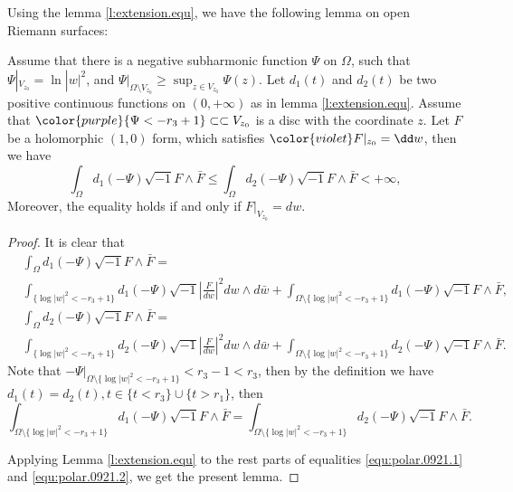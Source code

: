 Using the lemma \ref{l:extension.equ}, we have the following lemma on open Riemann
surfaces:

\begin{lemma}
  Assume that there is a negative
subharmonic function $\Psi$ on $\Omega$, such that
$\Psi|_{V_{z_0}}=\ln|w|^{2}$, and $\Psi|_{\Omega\setminus
V_{z_0}}\geq\sup_{z\in V_{z_0}}\Psi(z)$. Let $d_{1}(t)$ and
$d_{2}(t)$ be two positive continuous functions on $(0,+\infty)$ as
in lemma \ref{l:extension.equ}. Assume that
${\color{purple}\{\Psi<-r_{3}+1\}\subset\subset V_{z_0}}$ is a disc with the
coordinate $z$. Let $F$ be a holomorphic $(1,0)$ form, which
satisfies ${\color{violet} F|_{z_{0}}=\dd w}$, then we have
$$\int_{\Omega}d_{1}(-\Psi)\sqrt{-1}F\wedge\bar{F}\leq\int_{\Omega}d_{2}(-\Psi)\sqrt{-1}F\wedge\bar{F}<+\infty,$$
Moreover, the equality holds if and only if $F|_{V_{z_0}}=dw$.
\end{lemma}

\begin{proof}
  It is clear that
  \begin{equation}
  \label{equ:polar.0921.1}
  \begin{split}
  &\int_{\Omega}d_{1}(-\Psi)\sqrt{-1}F\wedge\bar{F}
  =
  \\&\int_{\{\log|w|^{2}<-r_{3}+1\}}d_{1}(-\Psi)\sqrt{-1}|\frac{F}{dw}|^{2}dw\wedge d\bar{w}+
  \int_{\Omega\setminus\{\log|w|^{2}<-r_{3}+1\}}d_{1}(-\Psi)\sqrt{-1}F\wedge\bar{F},
  \end{split}
  \end{equation}
  \begin{equation}
  \label{equ:polar.0921.2}
  \begin{split}
  &\int_{\Omega}d_{2}(-\Psi)\sqrt{-1}F\wedge\bar{F}
  =
  \\&\int_{\{\log|w|^{2}<-r_{3}+1\}}d_{2}(-\Psi)\sqrt{-1}|\frac{F}{dw}|^{2}dw\wedge d\bar{w}+
  \int_{\Omega\setminus\{\log|w|^{2}<-r_{3}+1\}}d_{2}(-\Psi)\sqrt{-1}F\wedge\bar{F}.
  \end{split}
  \end{equation}
  Note that $-\Psi|_{\Omega\setminus\{\log|w|^{2}<-r_{3}+1\}}<r_{3}-1<r_3$,
  then by the definition we have $d_1(t)=d_2(t), t\in \{t<r_3\}\cup \{t>r_1\}$, then
  $$\int_{\Omega\setminus\{\log|w|^{2}<-r_{3}+1\}}d_{1}(-\Psi)\sqrt{-1}F\wedge\bar{F}
  =\int_{\Omega\setminus\{\log|w|^{2}<-r_{3}+1\}}d_{2}(-\Psi)\sqrt{-1}F\wedge\bar{F}.$$
  
  Applying Lemma \ref{l:extension.equ} to the rest parts of equalities
  \ref{equ:polar.0921.1} and \ref{equ:polar.0921.2}, we get the
  present lemma.
  \end{proof}
  

